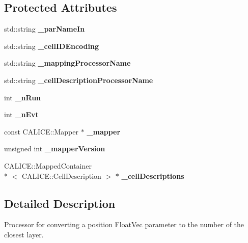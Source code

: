 \subsection*{Protected Attributes}
\begin{DoxyCompactItemize}
\item 
std\-::string {\bfseries \-\_\-par\-Name\-In}\label{classCALICE_1_1ConvertPositionToLayer_ab5771bf5dceebc05cf241c2f1268f6b3}

\item 
std\-::string {\bfseries \-\_\-cell\-I\-D\-Encoding}\label{classCALICE_1_1ConvertPositionToLayer_a373ae619279f0f1eb0c9277c236fe028}

\item 
std\-::string {\bfseries \-\_\-mapping\-Processor\-Name}\label{classCALICE_1_1ConvertPositionToLayer_a91aff57d115d8a16f06ac8f7939af5c7}

\item 
std\-::string {\bfseries \-\_\-cell\-Description\-Processor\-Name}\label{classCALICE_1_1ConvertPositionToLayer_af49914c248523c4a8d520fd238324202}

\item 
int {\bfseries \-\_\-n\-Run}\label{classCALICE_1_1ConvertPositionToLayer_ad2fd992c4000098077792de317bbb5b1}

\item 
int {\bfseries \-\_\-n\-Evt}\label{classCALICE_1_1ConvertPositionToLayer_ac4ce3ac8a9bfe3bf2d22e0e293346c3f}

\item 
const C\-A\-L\-I\-C\-E\-::\-Mapper $\ast$ {\bfseries \-\_\-mapper}\label{classCALICE_1_1ConvertPositionToLayer_a17d64aa238473785c0df64b0a5614b6f}

\item 
unsigned int {\bfseries \-\_\-mapper\-Version}\label{classCALICE_1_1ConvertPositionToLayer_a3195a7855b8d5baffdfc3cde745630e5}

\item 
C\-A\-L\-I\-C\-E\-::\-Mapped\-Container\\*
$<$ C\-A\-L\-I\-C\-E\-::\-Cell\-Description $>$ $\ast$ {\bfseries \-\_\-cell\-Descriptions}\label{classCALICE_1_1ConvertPositionToLayer_a3abd6f7b37da7cd4f13e9207c13c9fd7}

\end{DoxyCompactItemize}


\subsection{Detailed Description}
Processor for converting a position Float\-Vec parameter to the number of the closest layer. 

